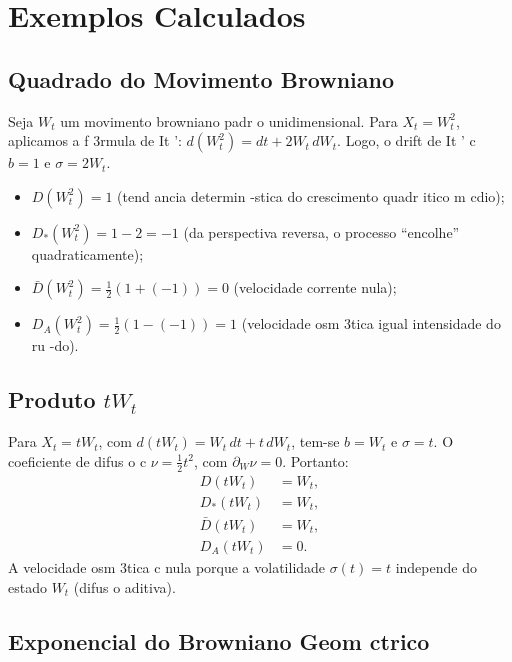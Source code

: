 \section{Exemplos Calculados}
\label{sec:nelson_exemplos}

\subsection{Quadrado do Movimento Browniano}

Seja $W_t$ um movimento browniano padr o unidimensional. Para $X_t = W_t^2$, aplicamos a f 3rmula de It ': $d(W_t^2) = dt + 2W_t\,dW_t$. Logo, o drift de It ' c $b=1$ e $\sigma=2W_t$.

\begin{itemize}
 \item $D(W_t^2) = 1$ (tend ancia determin -stica do crescimento quadr itico m cdio);
 \item $D_*(W_t^2) = 1 - 2 = -1$ (da perspectiva reversa, o processo ``encolhe'' quadraticamente);
 \item $\bar{D}(W_t^2) = \frac{1}{2}(1 + (-1)) = 0$ (velocidade corrente nula);
 \item $D_A(W_t^2) = \frac{1}{2}(1 - (-1)) = 1$ (velocidade osm 3tica igual intensidade do ru -do).
\end{itemize}

\subsection{Produto $tW_t$}

Para $X_t = tW_t$, com $d(tW_t) = W_t\,dt + t\,dW_t$, tem-se $b=W_t$ e $\sigma = t$. O coeficiente de difus o c $\nu = \frac{1}{2}t^2$, com $\partial_W\nu = 0$. Portanto:
\begin{align*}
 D(tW_t) &= W_t, \\
 D_*(tW_t) &= W_t, \\
 \bar{D}(tW_t) &= W_t, \\
 D_A(tW_t) &= 0.
\end{align*}
A velocidade osm 3tica c nula porque a volatilidade $\sigma(t) = t$ independe do estado $W_t$ (difus o aditiva).

\subsection{Exponencial do Browniano Geom ctrico}

